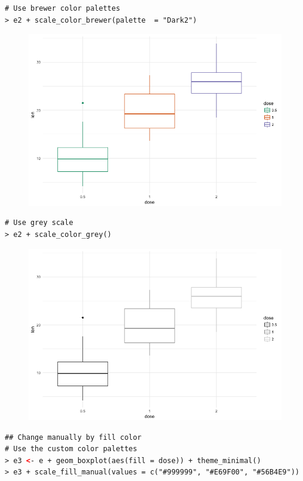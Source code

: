 \begin{lstlisting}[language=html]
# Use brewer color palettes
> e2 + scale_color_brewer(palette  = "Dark2")
\end{lstlisting}
\begin{figure}[H]\begin{center}\includegraphics[scale=1 ]{ilu/bg81.png}\end{center}\end{figure}
\begin{lstlisting}[language=html]
# Use grey scale
> e2 + scale_color_grey()
\end{lstlisting}
\begin{figure}[H]\begin{center}\includegraphics[scale=1 ]{ilu/bg82.png}\end{center}\end{figure}
\begin{lstlisting}[language=html]
## Change manually by fill color
# Use the custom color palettes
> e3 <- e + geom_boxplot(aes(fill = dose)) + theme_minimal()
> e3 + scale_fill_manual(values = c("#999999", "#E69F00", "#56B4E9"))
\end{lstlisting}
